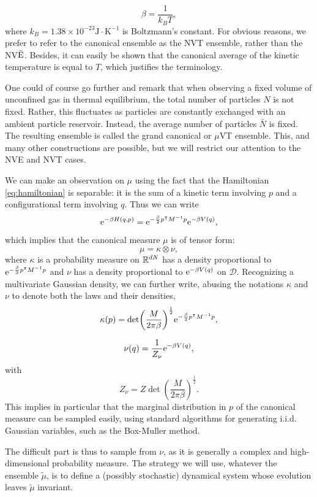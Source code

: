     $$ \beta = \frac 1{k_B T},$$
    where $k_B=1.38 \times 10 ^{-23} \mathrm{J\cdot K^{-1}}$ is Boltzmann's constant. For obvious reasons, we prefer to refer to the canonical ensemble as the NVT ensemble, rather than the NV$\bar {\text E}$.
    Besides, it can easily be shown that the canonical average of the kinetic temperature is equal to $T$, which justifies the terminology.

\begin{remark}
    One could of course go further and remark that when observing a fixed volume of unconfined gas in thermal equilibrium, the total number of particles $N$ is not fixed.
    Rather, this fluctuates as particles are constantly exchanged with an ambient particle reservoir.
    Instead, the average number of particles $\bar N$ is fixed.
    The resulting ensemble is called the grand canonical or $\mu$VT ensemble.
    This, and many other constructions are possible, but we will restrict our attention to the NVE and NVT cases. 
\end{remark}

\begin{remark}
We can make an observation on $\mu$ using the fact that the Hamiltonian \ref{eq:hamiltonian} is separable: it is the sum of a kinetic term involving $p$ and a configurational term involving $q$. Thus we can write
$$\mathrm{e}^{-\beta H(q,p)}=\mathrm{e}^{-\frac\beta 2p^\intercal M^{-1}p}\mathrm{e}^{-\beta V(q)},$$
which implies that the canonical measure $\mu$ is of tensor form: 
\begin{equation}\label{eq:tensor_form}\mu = \kappa \otimes \nu, \end{equation}
where $\kappa$ is a probability measure on $\mathbb{R}^{dN}$ has a density proportional to $\mathrm{e}^{-\frac\beta 2p^\intercal M^{-1}p}$ and $\nu$ has a density proportional to $\mathrm{e}^{-\beta V(q)}$ on $\mathcal D$.
Recognizing a multivariate Gaussian density, we can further write, abusing the notations $\kappa$ and $\nu$ to denote both the laws and their densities,
\begin{equation}
    \label{eq:kappa_marginal}
    \kappa(p)=\det(\frac{M}{2\pi\beta})^{\frac 12}\mathrm{e}^{-\frac\beta2p^\intercal M^{-1}p},
\end{equation}

\begin{equation}
    \label{eq:nu_marginal}
    \nu(q)=\frac1{Z_\nu}\mathrm{e}^{-\beta V(q)},
\end{equation}
with $$ Z_\nu= Z\det(\frac{M}{2\pi\beta})^{\frac 12}.$$
This implies in particular that the marginal distribution in $p$ of the canonical measure can be sampled easily, using standard algorithms for generating i.i.d. Gaussian variables, such as the Box-Muller method.
\end{remark}
The difficult part is thus to sample from $\nu$, as it is generally a complex and high-dimensional probability measure. 
The strategy we will use, whatever the ensemble $\widetilde{\mu}$, is to define a (possibly stochastic) dynamical system whose evolution leaves $\widetilde{\mu}$ invariant.

